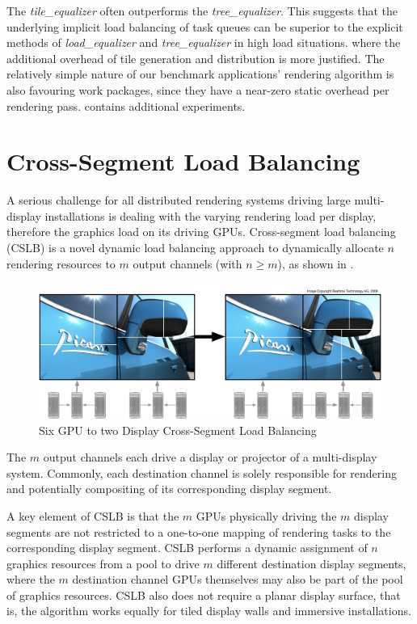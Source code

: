 The {\em tile\_equalizer} often outperforms the {\em tree\_equalizer}. This
suggests that the underlying implicit load balancing of task queues can be
superior to the explicit methods of {\em load\_equalizer} and
{\em tree\_equalizer} in high load situations. where the additional overhead
of tile generation and distribution is more justified. The relatively simple
nature of our benchmark applications' rendering algorithm is also favouring
work packages, since they have a near-zero static overhead per rendering pass.
\cite{SPEP:16} contains additional experiments.

\section{Cross-Segment Load Balancing}

A serious challenge for all distributed rendering systems driving large
multi-display installations is dealing with the varying rendering load per
display, therefore the graphics load on its driving GPUs. Cross-segment load
balancing (CSLB) is a novel dynamic load balancing approach to dynamically
allocate $n$ rendering resources to $m$ output channels (with $n\geq m$), as
shown in .

\begin{figure}[h!t]
  \includegraphics[width=\textwidth]{images/vieweq}
  \caption{\label{fvieweq}Six GPU to two Display Cross-Segment Load Balancing}
\end{figure}

The $m$ output channels each drive a display or projector of a multi-display
system. Commonly, each destination channel is solely responsible for rendering
and potentially compositing of its corresponding display segment.

A key element of CSLB is that the $m$ GPUs physically driving the $m$ display
segments are not restricted to a one-to-one mapping of rendering tasks to the
corresponding display segment. CSLB performs a dynamic assignment of $n$
graphics resources from a pool to drive $m$ different destination display
segments, where the $m$ destination channel GPUs themselves may also be part of
the pool of graphics resources. CSLB also does not require a planar display
surface, that is, the algorithm works equally for tiled display walls and
immersive installations.


